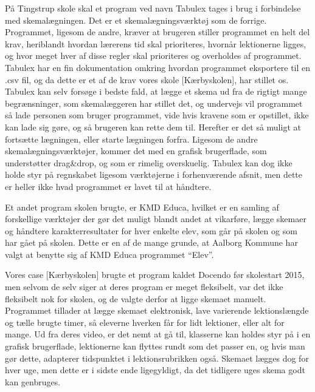 På Tingstrup skole skal et program ved navn Tabulex tages i brug i forbindelse med skemalægningen. Det er et skemalægningsværktøj som de forrige. Programmet, ligesom de andre, kræver at brugeren stiller programmet en helt del krav, heriblandt hvordan lærerens tid skal prioriteres, hvornår lektionerne ligges, og hvor meget hver af disse regler skal prioriteres og overholdes af programmet\cite{Tabulex}. Tabulex har en fin dokumentation omkring hvordan programmet eksportere til en .csv fil\cite{Tabulex_csv}, og da dette er et af de krav vores skole [Kærbyskolen], har stillet os\cite{Interview_Kaerby}. Tabulex kan selv forsøge i bedste fald, at lægge et skema ud fra de rigtigt mange begrænsninger, som skemalæggeren har stillet det, og undervejs vil programmet så lade personen som bruger programmet, vide hvis kravene som er opstillet, ikke kan lade sig gøre, og så brugeren kan rette dem til. Herefter er det så muligt at fortsætte lægningen, eller starte lægningen forfra. Ligesom de andre skemalægningsværktøjer, kommer det med en grafisk brugerflade, som understøtter drag\&drop, og som er rimelig overskuelig. Tabulex kan dog ikke holde styr på regnskabet ligesom værktøjerne i forhenværende afsnit, men dette er heller ikke hvad programmet er lavet til at håndtere.

Et andet program skolen brugte, er KMD Educa, hvilket er en samling af forskellige værktøjer\cite{KMD} der gør det muligt blandt andet at vikarføre, lægge skemaer og håndtere karakterresultater for hver enkelte elev, som går på skolen og som har gået på skolen. Dette er en af de mange grunde, at Aalborg Kommune har valgt at benytte sig af KMD Educa programmet ``Elev''\cite{useCase_KMD_Educa_Elev}.

Vores case [Kærbyskolen] brugte et program kaldet Docendo før skolestart 2015, men selvom de selv siger at deres program er meget fleksibelt\cite{Docendo}, var det ikke fleksibelt nok for skolen, og de valgte derfor at ligge skemaet manuelt. Programmet tillader at lægge skemaet elektronisk, lave varierende lektionslængde og tælle brugte timer, så eleverne hverken får for lidt lektioner, eller alt for mange. Ud fra deres video\cite{Docendo_video}, er det nemt at gå til, klasserne kan holdes styr på i en grafisk brugerflade, lektionerne kan flyttes rundt som det passer en, og hvis man gør dette, adapterer tidspunktet i lektionsrubrikken også. Skemaet lægges dog for hver uge, men dette er i sidste ende ligegyldigt, da det tidligere uges skema godt kan genbruges.